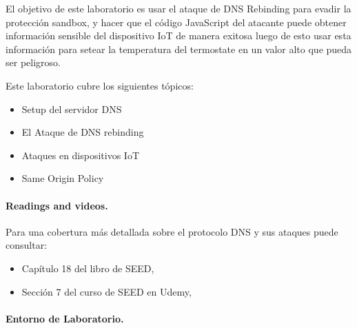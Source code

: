 El objetivo de este laboratorio es usar el ataque de DNS Rebinding para evadir la protección sandbox, y hacer que el código JavaScript del atacante puede obtener información sensible del dispositivo IoT de manera exitosa luego de esto usar esta información para setear la temperatura del termostate en un valor alto que pueda ser peligroso. 

Este laboratorio cubre los siguientes tópicos:

\begin{itemize}[noitemsep]
\item Setup del servidor DNS
\item El Ataque de DNS rebinding 
\item Ataques en dispositivos IoT
\item Same Origin Policy
\end{itemize}


\paragraph{Readings and videos.}
Para una cobertura más detallada sobre el protocolo DNS y sus ataques puede consultar:

\begin{itemize}
\item Capítulo 18 del libro de SEED, \seedbook
\item Sección 7 del curso de SEED en Udemy, \seedisvideo
\end{itemize}


\paragraph{Entorno de Laboratorio.} \seedenvironmentC








